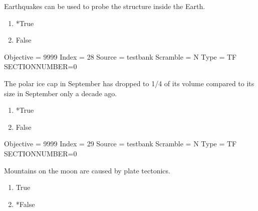\documentclass[11pt]{article}
\begin{document}
\begin{enumerate}
\begin{minipage}{\textwidth}
\begin{minipage}{\textwidth}
\item Earthquakes can be used to probe the structure inside the Earth.
\begin{multicols}{3}
\begin{enumerate} 
\setlength{\itemsep}{1pt} 
\setlength{\parskip}{0pt} 
\setlength{\parsep}{0pt}
\setlength{\multicolsep}{1pt} 
\item *True
\item False
\end{enumerate} 
\vfill 
\end{multicols}

Objective = 9999
Index = 28
Source = testbank
Scramble = N
Type = TF
SECTIONNUMBER=0
\end{minipage}
\end{minipage}
\vskip 0.20in

\begin{minipage}{\textwidth}
\begin{minipage}{\textwidth}
\item The polar ice cap in September has dropped to 1/4 of its volume compared to its size in September only a decade ago.
\begin{multicols}{3}
\begin{enumerate} 
\setlength{\itemsep}{1pt} 
\setlength{\parskip}{0pt} 
\setlength{\parsep}{0pt}
\setlength{\multicolsep}{1pt} 
\item *True
\item False
\end{enumerate} 
\vfill 
\end{multicols}

Objective = 9999
Index = 29
Source = testbank
Scramble = N
Type = TF
SECTIONNUMBER=0
\end{minipage}
\end{minipage}
\vskip 0.20in

\begin{minipage}{\textwidth}
\begin{minipage}{\textwidth}
\item Mountains on the moon are caused by plate tectonics.
\begin{multicols}{3}
\begin{enumerate} 
\setlength{\itemsep}{1pt} 
\setlength{\parskip}{0pt} 
\setlength{\parsep}{0pt}
\setlength{\multicolsep}{1pt} 
\item True
\item *False
\end{enumerate} 
\vfill 
\end{multicols}


\end{minipage}
\end{minipage}
\end{enumerate}
\end{document}
